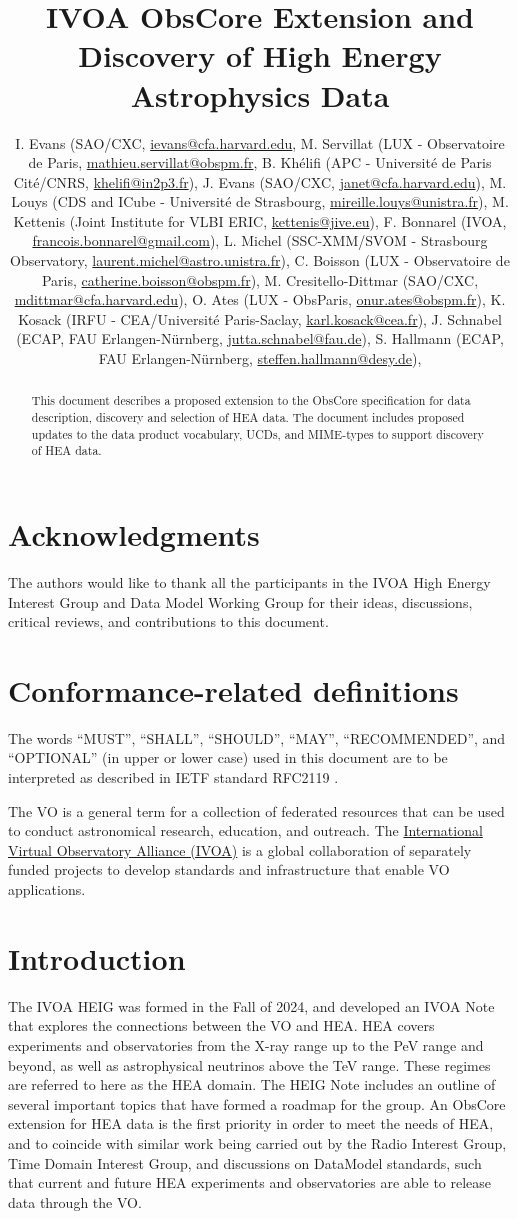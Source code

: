 \documentclass[11pt,a4paper]{ivoa}
\title{IVOA ObsCore Extension and Discovery of High Energy Astrophysics Data}
\author{
	I. Evans (SAO/CXC, \href{mailto:ievans@cfa.harvard.edu}{ievans@cfa.harvard.edu},
	M. Servillat (LUX - Observatoire de Paris, \href{mailto:mathieu.servillat@obspm.fr}{mathieu.servillat@obspm.fr},
	B. Khélifi (APC - Université de Paris Cité/CNRS, \href{mailto:khelifi@in2p3.fr}{khelifi@in2p3.fr}),
	J. Evans (SAO/CXC, \href{mailto:janet@cfa.harvard.edu}{janet@cfa.harvard.edu}),
	M. Louys (CDS and ICube - Université de Strasbourg, \href{mailto:mireille.louys@unistra.fr}{mireille.louys@unistra.fr}),
	M. Kettenis (Joint Institute for VLBI ERIC, \href{mailto:kettenis@jive.eu}{kettenis@jive.eu}),
	F. Bonnarel (IVOA, \href{mailto:francois.bonnarel@gmail.com}{francois.bonnarel@gmail.com}),
	L. Michel (SSC-XMM/SVOM - Strasbourg Observatory, \href{mailto:laurent.michel@astro.unistra.fr}{laurent.michel@astro.unistra.fr}),
	C. Boisson (LUX - Observatoire de Paris, \href{mailto:catherine.boisson@obspm.fr}{catherine.boisson@obspm.fr}),
	M. Cresitello-Dittmar (SAO/CXC, \href{mailto:mdittmar@cfa.harvard.edu}{mdittmar@cfa.harvard.edu}),
	O. Ates (LUX - ObsParis, \href{mailto:onur.ates@obspm.fr}{onur.ates@obspm.fr}),
	K. Kosack (IRFU - CEA/Université Paris-Saclay, \href{mailto:karl.kosack@cea.fr}{karl.kosack@cea.fr}),
	J. Schnabel (ECAP, FAU Erlangen-N{\"u}rnberg, \href{mailto:jutta.schnabel@fau.de}{jutta.schnabel@fau.de}),
	S. Hallmann (ECAP, FAU Erlangen-N{\"u}rnberg, \href{mailto:steffen.hallmann@fau.de}{steffen.hallmann@desy.de}),
}
\begin{document}
\begin{abstract}
This document describes a proposed extension to the ObsCore specification for data description, discovery and selection of \gls{HEA} data. The document includes proposed updates to the data product vocabulary, UCDs, and MIME-types to support discovery of \gls{HEA} data.
\end{abstract}


\section*{Acknowledgments}

The authors would like to thank all the participants in the IVOA High Energy Interest Group and Data Model Working Group for their ideas, discussions, critical reviews, and contributions to this document.


\section*{Conformance-related definitions}

The words ``MUST'', ``SHALL'', ``SHOULD'', ``MAY'', ``RECOMMENDED'', and ``OPTIONAL'' (in upper or lower case) used in this document are to be interpreted as described in IETF standard RFC2119 \citep{std:RFC2119}.

The \gls{VO} is a general term for a collection of federated resources that can be used to conduct astronomical research, education, and outreach.
The \href{https://www.ivoa.net}{International Virtual Observatory Alliance (IVOA)} is a global collaboration of separately funded projects to develop standards and infrastructure that enable VO applications.


\section{Introduction}

The \gls{IVOA} \gls{HEIG} was formed in the Fall of 2024, and developed an \gls{IVOA} Note \citep{2024ivoa.note.heig} that explores the connections between the \gls{VO} and \gls{HEA}\null. \gls{HEA} covers experiments and observatories from the X-ray range up to the PeV range and beyond, as well as astrophysical neutrinos above the TeV range.  These regimes are referred to here as the \gls{HEA} domain. The \gls{HEIG} Note includes an outline of several important topics that have formed a roadmap for the group. An ObsCore \citep{2017ivoa.spec.0509L} extension for \gls{HEA} data is the first priority in order to meet the needs of \gls{HEA}, and to coincide with similar work being carried out by the Radio Interest Group, Time Domain Interest Group, and discussions on DataModel standards, such that current and future \gls{HEA} experiments and observatories are able to release data through the \gls{VO}.
\end{document}

